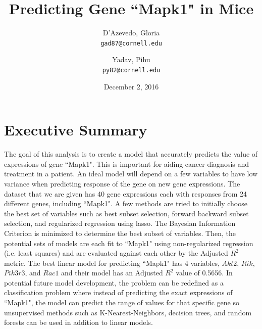 \documentclass{article}
\title{Predicting Gene ``Mapk1" in Mice}
\author{
  D'Azevedo, Gloria\\
  \texttt{gad87@cornell.edu}
  \and
  Yadav, Pihu\\
  \texttt{py82@cornell.edu}
}
\date{December 2, 2016}
\begin{document}
\maketitle

\tableofcontents

\section{Executive Summary}
The goal of this analysis is to create a model that accurately predicts the value of expressions of gene ``Mapk1".  This is important for aiding cancer diagnosis and treatment in a patient.  An ideal model will depend on a few variables to have low variance when predicting response of the gene on new gene expressions.  The dataset that we are given has 40 gene expressions each with responses from 24 different genes, including ``Mapk1".  A few methods are tried to initially choose the best set of variables such as best subset selection, forward backward subset selection, and regularized regression using lasso.  The Bayesian Information Criterion is minimized to determine the best subset of variables.  Then, the potential sets of models are each fit to ``Mapk1" using non-regularized regression (i.e. least squares) and are evaluated against each other by the Adjusted $R^2$ metric.  The best linear model for predicting ``Mapk1" has 4 variables, $Akt2$, $Rik$, $Pik3r3$, and $Rac1$ and their model has an Adjusted $R^2$ value of 0.5656.  In potential future model development, the problem can be redefined as a classification problem where instead of predicting the exact expressions of ``Mapk1", the model can predict the range of values for that specific gene so unsupervised methods such as K-Nearest-Neighbors, decision trees, and random forests can be used in addition to linear models.
\end{document}
